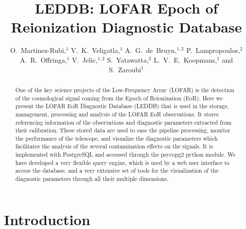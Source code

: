 
\resetcounters


\title{LEDDB: LOFAR Epoch of Reionization Diagnostic Database}
\author{O.~Martinez-Rubi,$^1$ V.~K.~Veligatla,$^1$ A.~G.~de~Bruyn,$^{1,2}$ P.~Lampropoulos,$^2$ A.~R.~Offringa,$^1$ V.~Jelic,$^{1,2}$ S.~Yatawatta,$^2$ L.~V.~E.~Koopmans,$^1$ and S.~Zaroubi$^1$
}


\begin{abstract}
One of the key science projects of the Low-Frequency Array (LOFAR) is the detection of the cosmological signal coming from the Epoch of Reionization (EoR). Here we present the LOFAR EoR Diagnostic Database (LEDDB) that is used in the storage, management, processing and analysis of the LOFAR EoR observations. It stores referencing information of the observations and diagnostic parameters extracted from their calibration. These stored data are used to ease the pipeline processing, monitor the performance of the telescope, and visualize the diagnostic parameters which facilitates the analysis of the several contamination effects on the signals. It is implemented with PostgreSQL and accessed through the psycopg2 python module. We have developed a very flexible query engine, which is used by a web user interface to access the database, and a very extensive set of tools for the visualization of the diagnostic parameters through all their multiple dimensions.
\end{abstract}

\section{Introduction}

